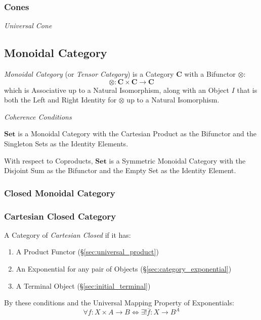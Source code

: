 \subsubsection{Cones}\label{sec:category_cone}

\emph{Universal Cone}




\subsection{Monoidal Category}\label{sec:monoidal_category}

\emph{Monoidal Category} (or \emph{Tensor Category}) is a Category
$\mathbf{C}$ with a Bifunctor $\otimes$:
\[
    \otimes : \mathbf{C} \times \mathbf{C} \rightarrow \mathbf{C}
\]
which is Associative up to a Natural Isomorphism, along with an Object
$I$ that is both the Left and Right Identity for $\otimes$ up to a
Natural Isomorphism.

\emph{Coherence Conditions}

$\mathbf{Set}$ is a Monoidal Category with the Cartesian Product as
the Bifunctor and the Singleton Sets as the Identity Elements.

With respect to Coproducts, $\mathbf{Set}$ is a Symmetric Monoidal
Category with the Disjoint Sum as the Bifunctor and the Empty
Set as the Identity Element.

\subsubsection{Closed Monoidal Category}\label{sec:closed_monoidal}

\subsubsection{Cartesian Closed Category}\label{sec:cartesian_category}

A Category of \emph{Cartesian Closed} if it has:
\begin{enumerate}
\item A Product Functor (\S\ref{sec:universal_product})
\item An Exponential for any pair of Objects
  (\S\ref{sec:category_exponential})
\item A Terminal Object (\S\ref{sec:initial_terminal})
\end{enumerate}
By these conditions and the Universal Mapping Property of
Exponentials:
\[
    \forall f : X \times A \rightarrow B \Leftrightarrow
    \exists ! \overline{f} : X \rightarrow B^A
\]


